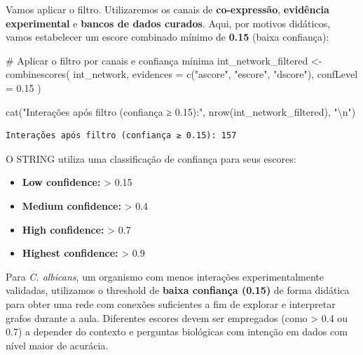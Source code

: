 \documentclass[
  letterpaper,
  DIV=11,
  numbers=noendperiod]{scrreprt}
\newenvironment{Shaded}{\begin{snugshade}}{\end{snugshade}}
\newcommand{\AttributeTok}[1]{\textcolor[rgb]{0.40,0.45,0.13}{#1}}
\newcommand{\CommentTok}[1]{\textcolor[rgb]{0.37,0.37,0.37}{#1}}
\newcommand{\FloatTok}[1]{\textcolor[rgb]{0.68,0.00,0.00}{#1}}
\newcommand{\FunctionTok}[1]{\textcolor[rgb]{0.28,0.35,0.67}{#1}}
\newcommand{\NormalTok}[1]{\textcolor[rgb]{0.00,0.23,0.31}{#1}}
\newcommand{\OtherTok}[1]{\textcolor[rgb]{0.00,0.23,0.31}{#1}}
\newcommand{\SpecialCharTok}[1]{\textcolor[rgb]{0.37,0.37,0.37}{#1}}
\newcommand{\StringTok}[1]{\textcolor[rgb]{0.13,0.47,0.30}{#1}}
\providecommand{\tightlist}{%
  \setlength{\itemsep}{0pt}\setlength{\parskip}{0pt}}
\begin{document}
Vamos aplicar o filtro. Utilizaremos os canais de \textbf{co-expressão},
\textbf{evidência experimental} e \textbf{bancos de dados curados}.
Aqui, por motivos didáticos, vamos estabelecer um escore combinado
mínimo de \textbf{0.15} (baixa confiança):

\begin{Shaded}
\begin{Highlighting}[]
\CommentTok{\# Aplicar o filtro por canais e confiança mínima}
\NormalTok{int\_network\_filtered }\OtherTok{\textless{}{-}} \FunctionTok{combinescores}\NormalTok{(}
\NormalTok{  int\_network,}
  \AttributeTok{evidences =} \FunctionTok{c}\NormalTok{(}\StringTok{"ascore"}\NormalTok{, }\StringTok{"escore"}\NormalTok{, }\StringTok{"dscore"}\NormalTok{),}
  \AttributeTok{confLevel =} \FloatTok{0.15}
\NormalTok{)}

\FunctionTok{cat}\NormalTok{(}\StringTok{"Interações após filtro (confiança ≥ 0.15):"}\NormalTok{, }\FunctionTok{nrow}\NormalTok{(int\_network\_filtered), }\StringTok{"}\SpecialCharTok{\textbackslash{}n}\StringTok{"}\NormalTok{)}
\end{Highlighting}
\end{Shaded}

\begin{verbatim}
Interações após filtro (confiança ≥ 0.15): 157 
\end{verbatim}

\begin{tcolorbox}[enhanced jigsaw, arc=.35mm, bottomrule=.15mm, bottomtitle=1mm, breakable, colback=white, colbacktitle=quarto-callout-note-color!10!white, colframe=quarto-callout-note-color-frame, coltitle=black, left=2mm, leftrule=.75mm, opacityback=0, opacitybacktitle=0.6, rightrule=.15mm, title=\textcolor{quarto-callout-note-color}{\faInfo}\hspace{0.5em}{Ponto Importante --- Escolha do Threshold}, titlerule=0mm, toprule=.15mm, toptitle=1mm]

O STRING utiliza uma classificação de confiança para seus escores:

\begin{itemize}
\tightlist
\item
  \textbf{Low confidence:} \textgreater{} 0.15
\item
  \textbf{Medium confidence:} \textgreater{} 0.4
\item
  \textbf{High confidence:} \textgreater{} 0.7
\item
  \textbf{Highest confidence:} \textgreater{} 0.9
\end{itemize}

Para \emph{C. albicans}, um organismo com menos interações
experimentalmente validadas, utilizamos o threshold de \textbf{baixa
confiança (0.15)} de forma didática para obter uma rede com conexões
suficientes a fim de explorar e interpretar grafos durante a aula.
Diferentes escores devem ser empregados (como \textgreater{} 0.4 ou 0.7)
a depender do contexto e perguntas biológicas com intenção em dados com
nível maior de acurácia.

\end{tcolorbox}
\end{document}
